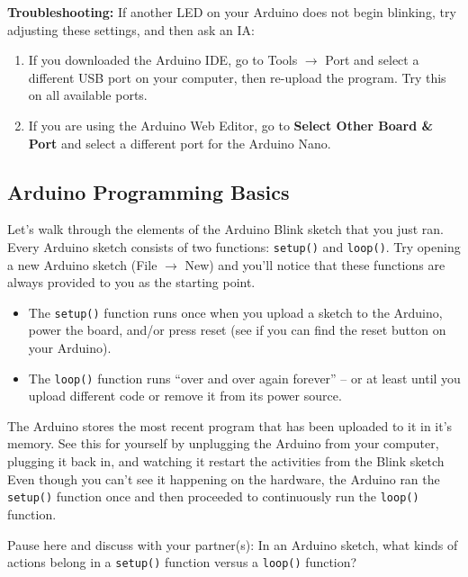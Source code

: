 \documentclass[12pt]{article}
\begin{document}
\begin{enumerate}
  \textbf{ Troubleshooting:} If another LED on your Arduino does not
  begin blinking, try adjusting these settings, and then ask an IA:
    
  \begin{enumerate}
  \item If you downloaded the Arduino IDE, go to Tools $\rightarrow$
    Port and select a different USB port on your computer, then
    re-upload the program. Try this on all available ports.
  \item If you are using the Arduino Web Editor, go to \textbf{Select
    Other Board \& Port} and select a different port for the Arduino
    Nano.
  \end{enumerate}
	   
\end{enumerate}


\subsection*{Arduino Programming Basics}
Let's walk through the elements of the Arduino Blink sketch that you
just ran. Every Arduino sketch consists of two functions:
\verb|setup()| and \verb|loop()|. Try opening a new Arduino sketch
(File $\rightarrow$ New) and you’ll notice that these functions are
always provided to you as the starting point.
        
\begin{itemize}
\item The \verb|setup()| function runs once when you upload a sketch
  to the Arduino, power the board, and/or press reset (see if you can
  find the reset button on your Arduino).
        
\item The \verb|loop()| function runs “over and over again forever” –
  or at least until you upload different code or remove it from its
  power source.
\end{itemize}

The Arduino stores the most recent program that has been uploaded to
it in it’s memory. See this for yourself by unplugging the Arduino
from your computer, plugging it back in, and watching it restart the
activities from the Blink sketch Even though you can't see it
happening on the hardware, the Arduino ran the \verb|setup()| function
once and then proceeded to continuously run the \verb|loop()|
function.
        
Pause here and discuss with your partner(s): In an Arduino sketch,
what kinds of actions belong in a \verb|setup()| function versus a
\verb|loop()| function?
        
\end{document}
